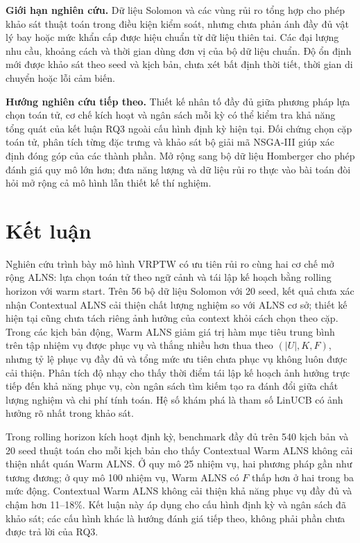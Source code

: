 \documentclass[11pt,a4paper]{article}
\begin{document}
\textbf{Giới hạn nghiên cứu.} Dữ liệu Solomon và các vùng rủi ro tổng hợp cho phép khảo sát thuật toán trong điều kiện kiểm soát, nhưng chưa phản ánh đầy đủ vật lý bay hoặc mức khẩn cấp được hiệu chuẩn từ dữ liệu thiên tai. Các đại lượng nhu cầu, khoảng cách và thời gian dùng đơn vị của bộ dữ liệu chuẩn. Độ ổn định mới được khảo sát theo seed và kịch bản, chưa xét bất định thời tiết, thời gian di chuyển hoặc lỗi cảm biến.

\textbf{Hướng nghiên cứu tiếp theo.} Thiết kế nhân tố đầy đủ giữa phương pháp lựa chọn toán tử, cơ chế kích hoạt và ngân sách mỗi kỳ có thể kiểm tra khả năng tổng quát của kết luận RQ3 ngoài cấu hình định kỳ hiện tại. Đối chứng chọn cặp toán tử, phân tích từng đặc trưng và khảo sát bộ giải mã NSGA-III giúp xác định đóng góp của các thành phần. Mở rộng sang bộ dữ liệu Homberger cho phép đánh giá quy mô lớn hơn; đưa năng lượng và dữ liệu rủi ro thực vào bài toán đòi hỏi mở rộng cả mô hình lẫn thiết kế thí nghiệm.

\section{Kết luận}
Nghiên cứu trình bày mô hình VRPTW có ưu tiên rủi ro cùng hai cơ chế mở rộng ALNS: lựa chọn toán tử theo ngữ cảnh và tái lập kế hoạch bằng rolling horizon với warm start. Trên 56 bộ dữ liệu Solomon với 20 seed, kết quả chưa xác nhận Contextual ALNS cải thiện chất lượng nghiệm so với ALNS cơ sở; thiết kế hiện tại cũng chưa tách riêng ảnh hưởng của context khỏi cách chọn theo cặp. Trong các kịch bản động, Warm ALNS giảm giá trị hàm mục tiêu trung bình trên tập nhiệm vụ được phục vụ và thắng nhiều hơn thua theo $(|U|,K,F)$, nhưng tỷ lệ phục vụ đầy đủ và tổng mức ưu tiên chưa phục vụ không luôn được cải thiện. Phân tích độ nhạy cho thấy thời điểm tái lập kế hoạch ảnh hưởng trực tiếp đến khả năng phục vụ, còn ngân sách tìm kiếm tạo ra đánh đổi giữa chất lượng nghiệm và chi phí tính toán. Hệ số khám phá là tham số LinUCB có ảnh hưởng rõ nhất trong khảo sát.

Trong rolling horizon kích hoạt định kỳ, benchmark đầy đủ trên 540 kịch bản và 20 seed thuật toán cho mỗi kịch bản cho thấy Contextual Warm ALNS không cải thiện nhất quán Warm ALNS. Ở quy mô 25 nhiệm vụ, hai phương pháp gần như tương đương; ở quy mô 100 nhiệm vụ, Warm ALNS có $F$ thấp hơn ở hai trong ba mức động. Contextual Warm ALNS không cải thiện khả năng phục vụ đầy đủ và chậm hơn 11--18\%. Kết luận này áp dụng cho cấu hình định kỳ và ngân sách đã khảo sát; các cấu hình khác là hướng đánh giá tiếp theo, không phải phần chưa được trả lời của RQ3.
\end{document}
